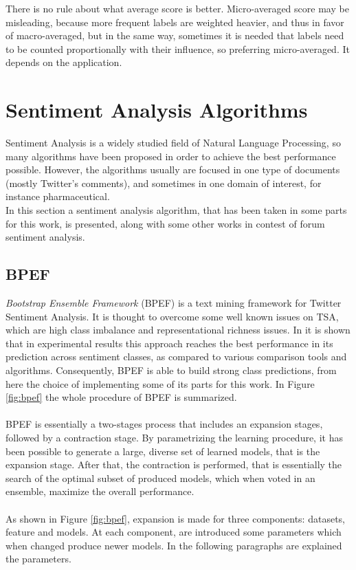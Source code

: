 There is no rule about what average score is better. Micro-averaged score may be misleading, because more frequent labels are weighted heavier, and thus in favor of macro-averaged, but in the same way, sometimes it is needed that labels need to be counted proportionally with their influence, so preferring micro-averaged. It depends on the application.



\section{Sentiment Analysis Algorithms}

Sentiment Analysis is a widely studied field of Natural Language Processing, so many algorithms have been proposed in order to achieve the best performance possible. However, the algorithms usually are focused in one type of documents (mostly Twitter's comments), and sometimes in one domain of interest, for instance pharmaceutical.\\
In this section a sentiment analysis algorithm, that has been taken in some parts for this work, is presented, along with some other works in contest of forum sentiment analysis.


\subsection{BPEF}

\textit{Bootstrap Ensemble Framework} (BPEF) \cite{Hassan2013TwitterSA} is a text mining framework for Twitter Sentiment Analysis. It is thought to overcome some well known issues on TSA, which are high class imbalance and representational richness issues. In \cite{Zimbra:2018:STS:3210372.3185045} it is shown that in experimental results this approach reaches the best performance in its prediction across sentiment classes, as compared to various comparison tools and algorithms. Consequently, BPEF is able to build strong class predictions, from here the choice of implementing some of its parts for this work. In Figure \ref{fig:bpef} the whole procedure of BPEF is summarized.\\
\\
BPEF is essentially a two-stages process that includes an expansion stages, followed by a contraction stage. By parametrizing the learning procedure, it has been possible to generate a large, diverse set of learned models, that is the expansion stage. After that, the contraction is performed, that is essentially the search of the optimal subset of produced models, which when voted in an ensemble, maximize the overall performance.\\
\\
As shown in Figure \ref{fig:bpef}, expansion is made for three components: datasets, feature and models. At each component, are introduced some parameters which when changed produce newer models. In the following paragraphs are explained the parameters.

